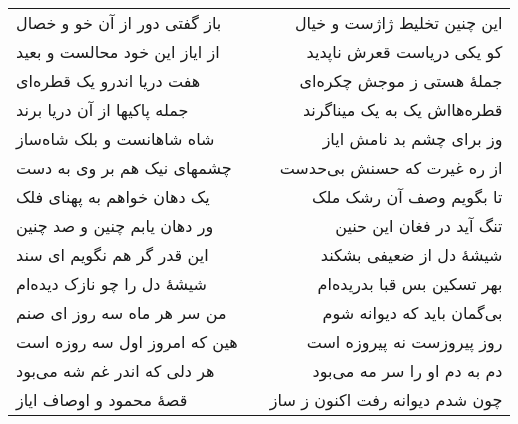 \begin{center}
\begin{longtable}{l p{0.5cm} r}
باز گفتی دور از آن خو و خصال
&&
این چنین تخلیط ژاژست و خیال
\\
از ایاز این خود محالست و بعید
&&
کو یکی دریاست قعرش ناپدید
\\
هفت دریا اندرو یک قطره‌ای
&&
جملهٔ هستی ز موجش چکره‌ای
\\
جمله پاکیها از آن دریا برند
&&
قطره‌هااش یک به یک میناگرند
\\
شاه شاهانست و بلک شاه‌ساز
&&
وز برای چشم بد نامش ایاز
\\
چشمهای نیک هم بر وی به دست
&&
از ره غیرت که حسنش بی‌حدست
\\
یک دهان خواهم به پهنای فلک
&&
تا بگویم وصف آن رشک ملک
\\
ور دهان یابم چنین و صد چنین
&&
تنگ آید در فغان این حنین
\\
این قدر گر هم نگویم ای سند
&&
شیشهٔ دل از ضعیفی بشکند
\\
شیشهٔ دل را چو نازک دیده‌ام
&&
بهر تسکین بس قبا بدریده‌ام
\\
من سر هر ماه سه روز ای صنم
&&
بی‌گمان باید که دیوانه شوم
\\
هین که امروز اول سه روزه است
&&
روز پیروزست نه پیروزه است
\\
هر دلی که اندر غم شه می‌بود
&&
دم به دم او را سر مه می‌بود
\\
قصهٔ محمود و اوصاف ایاز
&&
چون شدم دیوانه رفت اکنون ز ساز
\\
\end{longtable}
\end{center}
